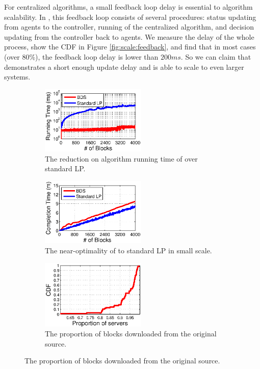  For centralized algorithms, a small feedback loop delay is essential to algorithm scalability. In \name, this feedback loop consists of several procedures: status updating from agents to the controller, running of the centralized algorithm, and decision updating from the controller back to agents. We measure the delay of the whole process, show the CDF in Figure \ref{fig:scale:feedback}, and find that in most cases (over 80\%), the feedback loop delay is lower than $200ms$. So we can claim that \name demonstrates a short enough update delay and is able to scale to even larger systems.

\begin{figure}[t]
        \centering
        \begin{subfigure}[b]{0.3\textwidth}
                \centering
                \includegraphics[width=50mm]{images/BDSvsLP_v2.eps} %
                \caption{The reduction on algorithm running time of \name over standard LP.}
                \label{fig:further:BDSvsLP}
        \end{subfigure}
        \begin{subfigure}[b]{0.3\textwidth}
                \centering
                \includegraphics[width=50mm]{images/BDSvsLP_CT.eps}%
                \caption{The near-optimality of \name to standard LP in small scale.}
                \label{fig:further:BDSvsLP_CT}
        \end{subfigure}
        \begin{subfigure}[b]{0.3\textwidth}
                \centering
                \includegraphics[width=50mm]{images/overlay.eps}
                \caption{The proportion of blocks downloaded from the original source.}
                \label{fig:further:overlay}
        \end{subfigure}
        \label{fig:further}
\vspace{-0.4cm}
\end{figure}

